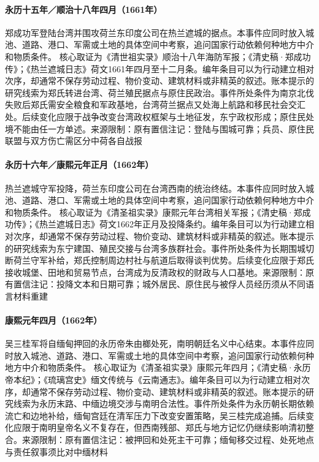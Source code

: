 \hypertarget{civic:EQ-1661-ZHENG-TAIWAN-LANDING}{}\paragraph{永历十五年／顺治十八年四月（1661年）}郑成功军登陆台湾并围攻荷兰东印度公司在热兰遮城的据点。本事件应同时放入城池、道路、港口、军需或土地的具体空间中考察，追问国家行动依赖何种地方中介和物质条件。 核心取证为《清世祖实录》顺治十八年海防军报；《清史稿·郑成功传》；《热兰遮城日志》荷文1661年四月至十二月条。编年条目可以为行动建立相对次序，却通常不保存劳动过程、物价变动、建筑材料或非精英的叙述。账本提示的研究线索为郑氏转进台湾、荷兰殖民据点与原住民政治。事件所处条件为南京北伐失败后郑氏需安全粮食和军政基地，台湾荷兰据点又处海上航路和移民社会交汇处。后续变化应限于战争改变台湾政权框架与土地征发，东宁政权形成；原住民处境不能由任一方单述。来源限制：原有置信注记：登陆与围城可靠；兵员、原住民联盟与双方伤亡需区分中荷各自战报
\hypertarget{civic:EQ-1662-ZEELANDIA}{}\paragraph{永历十六年／康熙元年正月（1662年）}热兰遮城守军投降，荷兰东印度公司在台湾西南的统治终结。本事件应同时放入城池、道路、港口、军需或土地的具体空间中考察，追问国家行动依赖何种地方中介和物质条件。 核心取证为《清圣祖实录》康熙元年台湾相关军报；《清史稿·郑成功传》；《热兰遮城日志》荷文1662年正月及投降条约。编年条目可以为行动建立相对次序，却通常不保存劳动过程、物价变动、建筑材料或非精英的叙述。账本提示的研究线索为东宁建国、殖民交接与台湾多族群社会。事件所处条件为长期围城切断荷兰守军补给，郑氏控制周边村社与航道后取得谈判优势。后续变化应限于郑氏接收城堡、田地和贸易节点，台湾成为反清政权的财政与人口基地。来源限制：原有置信注记：投降文本和日期可靠；城外居民、原住民与被俘人员经历须从不同语言材料重建
\hypertarget{civic:EQ-1662-YONGLI-EXECUTION}{}\paragraph{康熙元年四月（1662年）}吴三桂军将自缅甸押回的永历帝朱由榔处死，南明朝廷名义中心结束。本事件应同时放入城池、道路、港口、军需或土地的具体空间中考察，追问国家行动依赖何种地方中介和物质条件。 核心取证为《清圣祖实录》康熙元年四月；《清史稿·永历帝本纪》；《琉璃宫史》缅文传统与《云南通志》。编年条目可以为行动建立相对次序，却通常不保存劳动过程、物价变动、建筑材料或非精英的叙述。账本提示的研究线索为永历末路、中缅边境交涉与南明合法性。事件所处条件为永历朝长期依赖流亡和边地补给，缅甸宫廷在清军压力下改变安置策略，吴三桂完成追捕。后续变化应限于南明皇帝名义不复存在，但西南残部、郑氏与地方记忆仍继续影响清初整合。来源限制：原有置信注记：被押回和处死主干可靠；缅甸移交过程、处死地点与责任叙事须比对中缅材料
